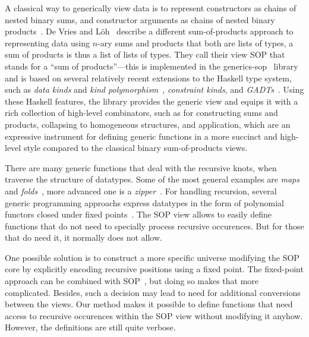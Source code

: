 \documentclass[runningheads]{llncs}
\begin{document}
A classical way to generically view data is to represent constructors as chains of nested binary sums, and constructor arguments as chains of nested binary products~\cite{VanNoort2008,Cheney2002,Loeh2004}\nocite{Rodriguez2008}\nocite{Magalhaes2012}. De Vries and L\"{o}h~\cite{VriLoeh2014} describe a different sum-of-products approach to representing data using $n$-ary sums and products that both are lists of types, a sum of products is thus a list of lists of types. They call their view SOP that stands for a ``sum of products''---this is implemented in the \textsf{generics-sop}~\cite{generics-sop} library and is based on several relatively recent extensions to the Haskell type system, such as \emph{data kinds} and \emph{kind polymorphism}~\cite{Yorgey2012}, \emph{constraint kinds}, and \emph{GADTs}~\cite{Schrijvers2009}. Using these Haskell features, the library provides the generic view and equips it with a rich collection of high-level combinators, such as for constructing sums and products, collapsing to homogeneous structures, and application, which are an expressive instrument for defining generic functions in a more succinct and high-level style compared to the classical binary sum-of-products views.

There are many generic functions that deal with the recursive knots, when traverse the structure of datatypes. Some of the most general examples are \emph{maps}~\cite{Magalhaes2010} and \emph{folds}~\cite{Meijer1991}, more advanced one is a \emph{zipper}~\cite{Huet1997,HiJeLo2004,Adams2010}. For handling recursion, several generic programming approachs express datatypes in the form of polynomial functors closed under fixed points~\cite{MuRec2009,Jansson1997,Loeh2011}\nocite{MagLoeh2012}. The SOP view allows to easily define functions that do not need to specially process recursive occurences. But for those that do need it, it normally does not allow.

One possible solution is to construct a more specific universe modifying the SOP core by explicitly encoding recursive positions using a fixed point. The fixed-point approach can be combined with SOP~\cite{VriLoeh2014}, but doing so makes that more complicated. Besides, such a decision may lead to need for additional conversions between the views. Our method makes it possible to define functions that need access to recursive occurences within the SOP view without modifying it anyhow. However, the definitions are still quite verbose.
\end{document}

